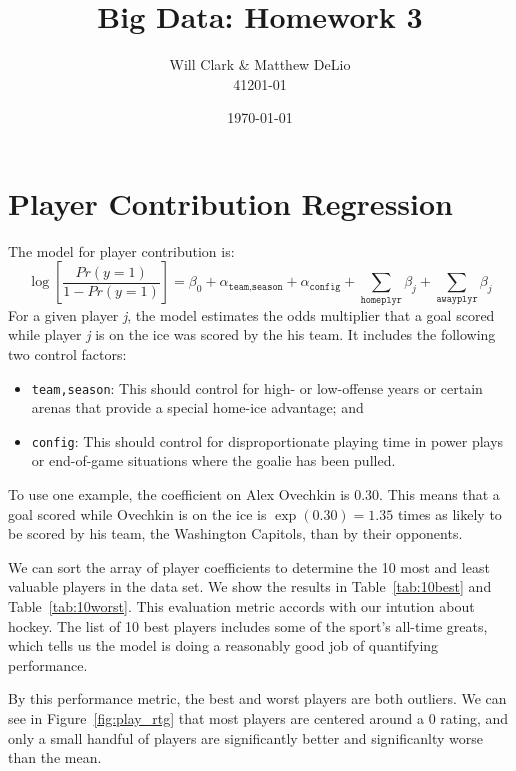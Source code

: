 \documentclass[11pt, fleqn]{article}
\begin{document}
\title{Big Data: Homework 3}
\author{Will Clark \& Matthew DeLio \\ 41201-01}
\date{\today}
\maketitle

\section{Player Contribution Regression}

The model for player contribution is:
\[ \log\left[\frac{Pr(y=1)}{1-Pr(y=1)}\right] = \beta_0 + \alpha_{\texttt{team,season}} + \alpha_{\texttt{config}} + \sum_{\texttt{homeplyr}} \beta_j + \sum_{\texttt{awayplyr}} \beta_j \]
For a given player \textit{j}, the model estimates the odds multiplier that a goal scored while player \textit{j} is on the ice was scored by the his team. It includes the following two control factors:
\begin{itemize}
  \item \texttt{team,season}: This should control for high- or low-offense years or certain arenas that provide a special home-ice advantage; and
  \item \texttt{config}: This should control for disproportionate playing time in power plays or end-of-game situations where the goalie has been pulled.
\end{itemize}
To use one example, the coefficient on Alex Ovechkin is 0.30. This means that a goal scored while Ovechkin is on the ice is $\exp(0.30)=1.35$ times as likely to be scored by his team, the Washington Capitols, than by their opponents.

We can sort the array of player coefficients to determine the 10 most and least valuable players in the data set. We show the results in Table~\ref{tab:10best} and Table~\ref{tab:10worst}. This evaluation metric accords with our intution about hockey. The list of 10 best players includes some of the sport's all-time greats, which tells us the model is doing a reasonably good job of quantifying performance.

By this performance metric, the best and worst players are both outliers. We can see in Figure~\ref{fig:play_rtg} that most players are centered around a 0 rating, and only a small handful of players are significantly better and significanlty worse than the mean.
\end{document}
